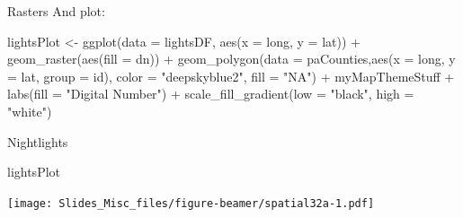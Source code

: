 \documentclass[
  ignorenonframetext,
]{beamer}
\newenvironment{Shaded}{\begin{snugshade}}{\end{snugshade}}
\newcommand{\AttributeTok}[1]{\textcolor[rgb]{0.77,0.63,0.00}{#1}}
\newcommand{\FunctionTok}[1]{\textcolor[rgb]{0.00,0.00,0.00}{#1}}
\newcommand{\NormalTok}[1]{#1}
\newcommand{\OtherTok}[1]{\textcolor[rgb]{0.56,0.35,0.01}{#1}}
\newcommand{\SpecialCharTok}[1]{\textcolor[rgb]{0.00,0.00,0.00}{#1}}
\newcommand{\StringTok}[1]{\textcolor[rgb]{0.31,0.60,0.02}{#1}}
\begin{document}
\begin{frame}[fragile]{Rasters}
\protect\hypertarget{rasters-2}{}
And plot: \tiny

\begin{Shaded}
\begin{Highlighting}[]
\NormalTok{lightsPlot }\OtherTok{\textless{}{-}} \FunctionTok{ggplot}\NormalTok{(}\AttributeTok{data =}\NormalTok{ lightsDF, }\FunctionTok{aes}\NormalTok{(}\AttributeTok{x =}\NormalTok{ long, }\AttributeTok{y =}\NormalTok{ lat)) }\SpecialCharTok{+}
        \FunctionTok{geom\_raster}\NormalTok{(}\FunctionTok{aes}\NormalTok{(}\AttributeTok{fill =}\NormalTok{ dn)) }\SpecialCharTok{+}
        \FunctionTok{geom\_polygon}\NormalTok{(}\AttributeTok{data =}\NormalTok{ paCounties,}\FunctionTok{aes}\NormalTok{(}\AttributeTok{x =}\NormalTok{ long, }\AttributeTok{y =}\NormalTok{ lat, }\AttributeTok{group =}\NormalTok{ id), }
                     \AttributeTok{color =} \StringTok{"deepskyblue2"}\NormalTok{, }\AttributeTok{fill =} \StringTok{"NA"}\NormalTok{) }\SpecialCharTok{+}
\NormalTok{        myMapThemeStuff }\SpecialCharTok{+} 
        \FunctionTok{labs}\NormalTok{(}\AttributeTok{fill =} \StringTok{"Digital Number"}\NormalTok{) }\SpecialCharTok{+}
        \FunctionTok{scale\_fill\_gradient}\NormalTok{(}\AttributeTok{low =} \StringTok{"black"}\NormalTok{, }\AttributeTok{high =} \StringTok{"white"}\NormalTok{)}
\end{Highlighting}
\end{Shaded}
\end{frame}

\begin{frame}[fragile]{Nightlights}
\protect\hypertarget{nightlights}{}
\begin{Shaded}
\begin{Highlighting}[]
\NormalTok{lightsPlot}
\end{Highlighting}
\end{Shaded}

\texttt{[image: Slides\_Misc\_files/figure-beamer/spatial32a-1.pdf]}
\end{frame}
\end{document}
